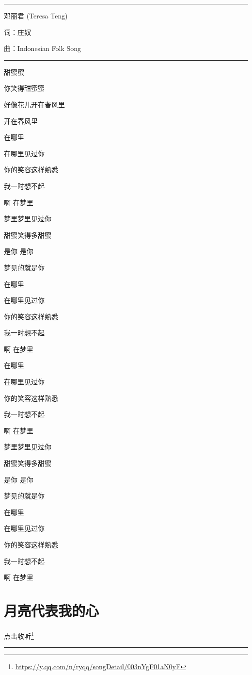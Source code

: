 \documentclass[]{ctexbook}
\renewcommand{\href}[2]{#2\footnote{\url{#1}}}
\begin{document}
\begin{center}\rule{0.5\linewidth}{0.5pt}\end{center}

邓丽君 (Teresa Teng)

词：庄奴

曲：Indonesian Folk Song

\begin{center}\rule{0.5\linewidth}{0.5pt}\end{center}

甜蜜蜜

你笑得甜蜜蜜

好像花儿开在春风里

开在春风里

在哪里

在哪里见过你

你的笑容这样熟悉

我一时想不起

啊 在梦里

梦里梦里见过你

甜蜜笑得多甜蜜

是你 是你

梦见的就是你

在哪里

在哪里见过你

你的笑容这样熟悉

我一时想不起

啊 在梦里

在哪里

在哪里见过你

你的笑容这样熟悉

我一时想不起

啊 在梦里

梦里梦里见过你

甜蜜笑得多甜蜜

是你 是你

梦见的就是你

在哪里

在哪里见过你

你的笑容这样熟悉

我一时想不起

啊 在梦里

\section*{月亮代表我的心}\label{my-heart-is-moon}


\href{https://y.qq.com/n/ryqq/songDetail/003nYgF01aN0yF}{点击收听}

\begin{center}\rule{0.5\linewidth}{0.5pt}\end{center}
\end{document}
